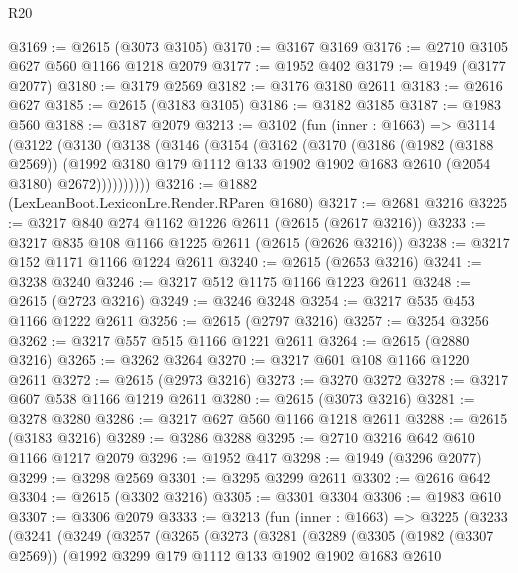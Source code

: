 \begin{lexlean}{R20}
\begin{coremodule}
{{{{{{{{{{{{{{{{{{{{{{{{{{{{{{{{{{{{{{{{{{{{{{{{{{{{{{{{{{{{{{{@3169 := @2615 (@3073 @3105)
@3170 := @3167 @3169
@3176 := @2710 @3105 @627 @560 @1166 @1218 @2079
@3177 := @1952 @402
@3179 := @1949 (@3177 @2077)
@3180 := @3179 @2569
@3182 := @3176 @3180 @2611
@3183 := @2616 @627
@3185 := @2615 (@3183 @3105)
@3186 := @3182 @3185
@3187 := @1983 @560
@3188 := @3187 @2079
@3213 := @3102
    (fun (inner : @1663) =>
    @3114
      (@3122
        (@3130
          (@3138
            (@3146
              (@3154
                (@3162
                  (@3170
                    (@3186
                      (@1982 (@3188 @2569))
                      (@1992
                        @3180
                        @179
                        @1112
                        @133
                        @1902
                        @1902
                        @1683
                        @2610
                        (@2054 @3180)
                        @2672))))))))))
@3216 := @1882 (LexLeanBoot.LexiconLre.Render.RParen @1680)
@3217 := @2681 @3216
@3225 := @3217 @840 @274 @1162 @1226 @2611 (@2615 (@2617 @3216))
@3233 := @3217 @835 @108 @1166 @1225 @2611 (@2615 (@2626 @3216))
@3238 := @3217 @152 @1171 @1166 @1224 @2611
@3240 := @2615 (@2653 @3216)
@3241 := @3238 @3240
@3246 := @3217 @512 @1175 @1166 @1223 @2611
@3248 := @2615 (@2723 @3216)
@3249 := @3246 @3248
@3254 := @3217 @535 @453 @1166 @1222 @2611
@3256 := @2615 (@2797 @3216)
@3257 := @3254 @3256
@3262 := @3217 @557 @515 @1166 @1221 @2611
@3264 := @2615 (@2880 @3216)
@3265 := @3262 @3264
@3270 := @3217 @601 @108 @1166 @1220 @2611
@3272 := @2615 (@2973 @3216)
@3273 := @3270 @3272
@3278 := @3217 @607 @538 @1166 @1219 @2611
@3280 := @2615 (@3073 @3216)
@3281 := @3278 @3280
@3286 := @3217 @627 @560 @1166 @1218 @2611
@3288 := @2615 (@3183 @3216)
@3289 := @3286 @3288
@3295 := @2710 @3216 @642 @610 @1166 @1217 @2079
@3296 := @1952 @417
@3298 := @1949 (@3296 @2077)
@3299 := @3298 @2569
@3301 := @3295 @3299 @2611
@3302 := @2616 @642
@3304 := @2615 (@3302 @3216)
@3305 := @3301 @3304
@3306 := @1983 @610
@3307 := @3306 @2079
@3333 := @3213
    (fun (inner : @1663) =>
    @3225
      (@3233
        (@3241
          (@3249
            (@3257
              (@3265
                (@3273
                  (@3281
                    (@3289
                      (@3305
                        (@1982 (@3307 @2569))
                        (@1992
                          @3299
                          @179
                          @1112
                          @133
                          @1902
                          @1902
                          @1683
                          @2610
}}}}}}}}}}}}}}}}}}}}}}}}}}}}}}}}}}}}}}}}}}}}}}}}}}}}}}}}}}}}}}}
\end{coremodule}
\end{lexlean}

